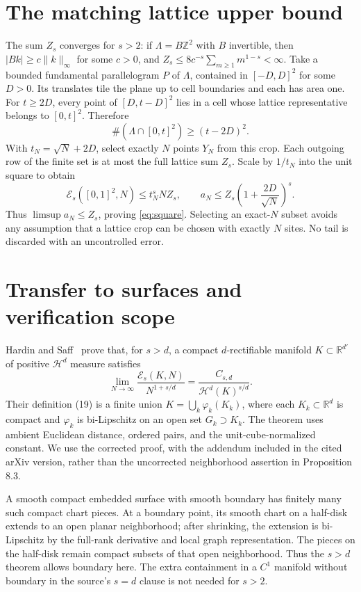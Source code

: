 \documentclass[11pt]{article}
\newcommand{\R}{\mathbb R}\newcommand{\Z}{\mathbb Z}
\newcommand{\Es}{\mathcal E_s}\newcommand{\Hs}{\mathcal H_s}
\newcommand{\abs}[1]{\lvert#1\rvert}\newcommand{\norm}[1]{\lVert#1\rVert}
\begin{document}
\section{The matching lattice upper bound}
The sum $Z_s$ converges for $s>2$: if $\Lambda=B\Z^2$ with $B$ invertible,
then $\abs{Bk}\ge c\norm{k}_\infty$ for some $c>0$, and
$Z_s\le8c^{-s}\sum_{m\ge1}m^{1-s}<\infty$.
Take a bounded fundamental parallelogram $P$ of $\Lambda$, contained in
$[-D,D]^2$ for some $D>0$. Its translates tile the plane up to cell
boundaries and each has area one. For $t\ge2D$, every point of
$[D,t-D]^2$ lies in a cell whose lattice representative belongs to
$[0,t]^2$. Therefore
\[
 \#(\Lambda\cap[0,t]^2)\ge(t-2D)^2.
\]
With $t_N=\sqrt N+2D$, select exactly $N$ points $Y_N$ from this crop.
Each outgoing row of the finite set is at most the full lattice sum $Z_s$.
Scale by $1/t_N$ into the unit square to obtain
\[
 \Es([0,1]^2,N)\le t_N^s N Z_s,\qquad
 a_N\le Z_s\left(1+\frac{2D}{\sqrt N}\right)^s.
\]
Thus $\limsup a_N\le Z_s$, proving \eqref{eq:square}.
Selecting an exact-$N$ subset avoids any assumption that a lattice crop
can be chosen with exactly $N$ sites. No tail is discarded with an
uncontrolled error.

\section{Transfer to surfaces and verification scope}
Hardin and Saff~\cite[Theorem 2.4]{HS2005} prove that, for $s>d$, a compact
$d$-rectifiable manifold $K\subset\R^{d'}$ of positive $\mathcal H^d$
measure satisfies
\[
 \lim_{N\to\infty}\frac{\Es(K,N)}{N^{1+s/d}}
          =\frac{C_{s,d}}{\mathcal H^d(K)^{s/d}}.
\]
Their definition (19) is a finite union $K=\bigcup_k\varphi_k(K_k)$,
where each $K_k\subset\R^d$ is compact and $\varphi_k$ is bi-Lipschitz
on an open set $G_k\supset K_k$. The theorem uses ambient Euclidean
distance, ordered pairs, and the unit-cube-normalized constant.
We use the corrected proof, with the addendum included in the cited
arXiv version, rather than the uncorrected neighborhood assertion in
Proposition 8.3.

A smooth compact embedded surface with smooth boundary has finitely many
such compact chart pieces. At a boundary point, its smooth chart on a
half-disk extends to an open planar neighborhood; after shrinking, the
extension is bi-Lipschitz by the full-rank derivative and local graph
representation. The pieces on the half-disk remain compact subsets of
that open neighborhood. Thus the $s>d$ theorem allows boundary here.
The extra containment in a $C^1$ manifold without boundary in the source's
$s=d$ clause is not needed for $s>2$.
\end{document}

